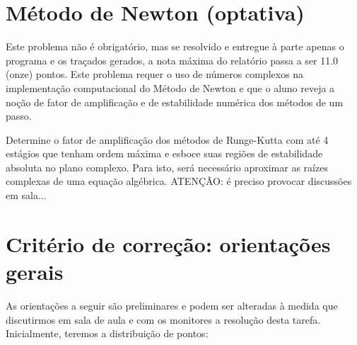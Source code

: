 \documentclass{article}
\begin{document}
\section{Método de Newton (optativa)}
Este problema não é obrigatório, mas se resolvido e entregue à parte apenas o programa e os traçados gerados, a nota máxima do relatório passa a ser 11.0 (onze) pontos. Este problema requer o uso de números complexos na implementação computacional do Método de Newton e que o aluno reveja a noção de fator de amplificação e de estabilidade numérica dos métodos de um passo. 


Determine o fator de amplificação dos métodos de Runge-Kutta com até 4 estágios que tenham ordem máxima e esboce suas regiões de estabilidade absoluta no plano complexo. Para isto, será necessário aproximar as  raízes complexas de uma equação algébrica. ATENÇÃO: é preciso provocar discussões em sala... 


\section{Critério de correção: orientações gerais}
As orientações a seguir são preliminares e podem ser alteradas à medida que discutirmos em sala de aula e com os monitores a resolução desta tarefa. Inicialmente, teremos a distribuição de pontos:
\end{document}
